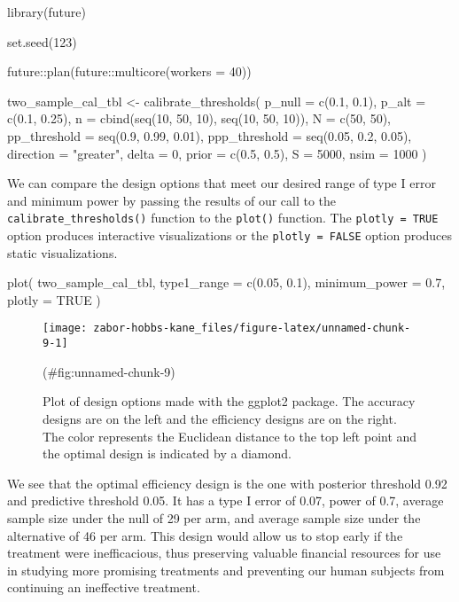 \begin{Schunk}
\begin{Sinput}
library(future)

set.seed(123)

future::plan(future::multicore(workers = 40))

two_sample_cal_tbl <- 
  calibrate_thresholds(
    p_null = c(0.1, 0.1), 
    p_alt = c(0.1, 0.25),
    n = cbind(seq(10, 50, 10), seq(10, 50, 10)),
    N = c(50, 50), 
    pp_threshold = seq(0.9, 0.99, 0.01),
    ppp_threshold = seq(0.05, 0.2, 0.05),
    direction = "greater", 
    delta = 0, 
    prior = c(0.5, 0.5), 
    S = 5000, 
    nsim = 1000
  )
\end{Sinput}
\end{Schunk}

We can compare the design options that meet our desired range of type I
error and minimum power by passing the results of our call to the
\texttt{calibrate\_thresholds()} function to the \texttt{plot()}
function. The \texttt{plotly\ =\ TRUE} option produces interactive
visualizations or the \texttt{plotly\ =\ FALSE} option produces static
visualizations.

\begin{Schunk}
\begin{Sinput}
plot(
  two_sample_cal_tbl, 
  type1_range = c(0.05, 0.1), 
  minimum_power = 0.7,
  plotly = TRUE
)
\end{Sinput}
\end{Schunk}

\begin{Schunk}
\begin{figure}
\texttt{[image: zabor-hobbs-kane\_files/figure-latex/unnamed-chunk-9-1]} \caption[Plot of design options made with the {ggplot2} package]{Plot of design options made with the {ggplot2} package. The accuracy designs are on the left and the efficiency designs are on the right. The color represents the Euclidean distance to the top left point and the optimal design is indicated by a diamond.}(\#fig:unnamed-chunk-9)
\end{figure}
\end{Schunk}

We see that the optimal efficiency design is the one with posterior
threshold 0.92 and predictive threshold 0.05. It has a type I error of
0.07, power of 0.7, average sample size under the null of 29 per arm,
and average sample size under the alternative of 46 per arm. This design
would allow us to stop early if the treatment were inefficacious, thus
preserving valuable financial resources for use in studying more
promising treatments and preventing our human subjects from continuing
an ineffective treatment.

